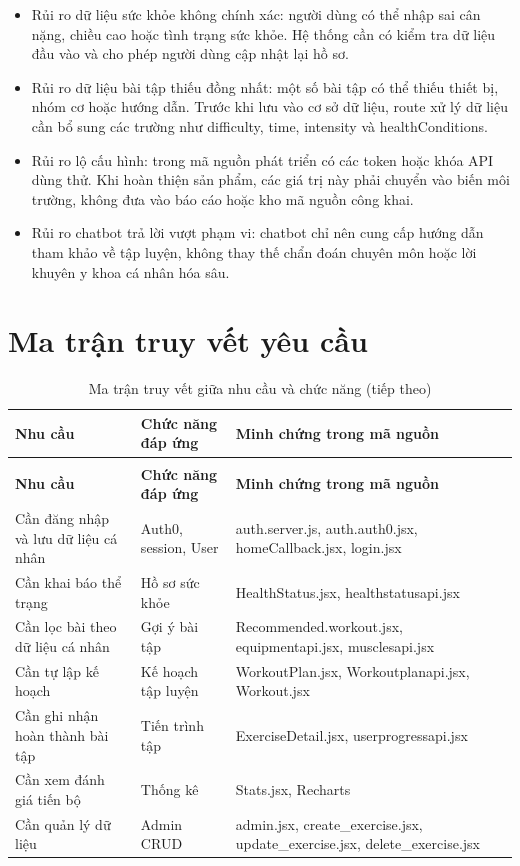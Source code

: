 \begin{itemize}

    \item Rủi ro dữ liệu sức khỏe không chính xác: người dùng có thể nhập sai cân nặng, chiều cao hoặc tình trạng sức khỏe. Hệ thống cần có kiểm tra dữ liệu đầu vào và cho phép người dùng cập nhật lại hồ sơ.

    \item Rủi ro dữ liệu bài tập thiếu đồng nhất: một số bài tập có thể thiếu thiết bị, nhóm cơ hoặc hướng dẫn. Trước khi lưu vào cơ sở dữ liệu, route xử lý dữ liệu cần bổ sung các trường như difficulty, time, intensity và healthConditions.

    \item Rủi ro lộ cấu hình: trong mã nguồn phát triển có các token hoặc khóa API dùng thử. Khi hoàn thiện sản phẩm, các giá trị này phải chuyển vào biến môi trường, không đưa vào báo cáo hoặc kho mã nguồn công khai.

    \item Rủi ro chatbot trả lời vượt phạm vi: chatbot chỉ nên cung cấp hướng dẫn tham khảo về tập luyện, không thay thế chẩn đoán chuyên môn hoặc lời khuyên y khoa cá nhân hóa sâu.

\end{itemize}

\section{Ma trận truy vết yêu cầu}

\begingroup
\setlength{\tabcolsep}{3pt}
\renewcommand{\arraystretch}{1.25}
\begin{longtable}{|P{0.220\textwidth}|P{0.330\textwidth}|P{0.370\textwidth}|}
\caption{Ma trận truy vết giữa nhu cầu và chức năng}\\
\hline
\textbf{Nhu cầu} & \textbf{Chức năng đáp ứng} & \textbf{Minh chứng trong mã nguồn} \\
\hline
\endfirsthead
\caption[]{Ma trận truy vết giữa nhu cầu và chức năng (tiếp theo)}\\
\hline
\textbf{Nhu cầu} & \textbf{Chức năng đáp ứng} & \textbf{Minh chứng trong mã nguồn} \\
\hline
\endhead
Cần đăng nhập và lưu dữ liệu cá nhân & Auth0, session, User & auth.server.js, auth.auth0.jsx, homeCallback.jsx, login.jsx \\
\hline
Cần khai báo thể trạng & Hồ sơ sức khỏe & HealthStatus.jsx, healthstatusapi.jsx \\
\hline
Cần lọc bài theo dữ liệu cá nhân & Gợi ý bài tập & Recommended.workout.jsx, equipmentapi.jsx, musclesapi.jsx \\
\hline
Cần tự lập kế hoạch & Kế hoạch tập luyện & WorkoutPlan.jsx, Workoutplanapi.jsx, Workout.jsx \\
\hline
Cần ghi nhận hoàn thành bài tập & Tiến trình tập & ExerciseDetail.jsx, userprogressapi.jsx \\
\hline
Cần xem đánh giá tiến bộ & Thống kê & Stats.jsx, Recharts \\
\hline
Cần quản lý dữ liệu & Admin CRUD & admin.jsx, create\_exercise.jsx, update\_exercise.jsx, delete\_exercise.jsx \\
\hline
\end{longtable}
\endgroup
